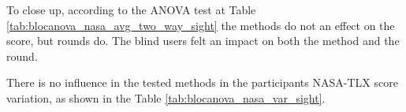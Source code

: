
%

To close up, according to the ANOVA test at Table \ref{tab:blocanova_nasa_avg_two_way_sight} the methods do not an effect on the score, but rounds do. The blind users felt an impact on both the method and the round.

There is no influence in the tested methods in the participants NASA-TLX score variation, as shown in the Table \ref{tab:blocanova_nasa_var_sight}.

\FloatBarrier